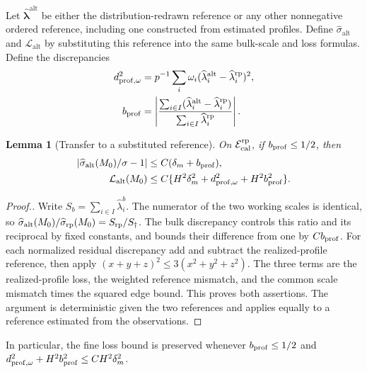 \documentclass[numsec,webpdf,modern,large,namedate]{oup-authoring-template}
\theoremstyle{plain}
\newtheorem{slemma}{Lemma}%
\theoremstyle{remark}
\newif\ifmarkchanges
\newenvironment{revision}{\begingroup\ifmarkchanges\color{red}\fi}{\endgroup}
\begin{document}
\begin{revision}
Let $\widehat{\bm\lambda}^{\mathrm{alt}}$ be either the distribution-redrawn
reference or any other nonnegative ordered reference, including one constructed
from estimated profiles.  Define $\widehat\sigma_{\mathrm{alt}}$ and
$\mathcal L_{\mathrm{alt}}$ by substituting this reference into the same
bulk-scale and loss formulas.  Define the discrepancies
\begin{align}
 d_{\rm prof,\omega}^2
 &=p^{-1}\sum_i\omega_i
       (\widehat\lambda_i^{\mathrm{alt}}-\widehat\lambda_i^{\rm rp})^2,
 \label{eq:vp_profile_weighted_mismatch}\\
 b_{\rm prof}
 &=\left|\frac{\sum_{i\in I}(\widehat\lambda_i^{\mathrm{alt}}
                          -\widehat\lambda_i^{\rm rp})}
                    {\sum_{i\in I}\widehat\lambda_i^{\rm rp}}\right|.
 \label{eq:vp_profile_bulk_mismatch}
\end{align}
\begin{slemma}[Transfer to a substituted reference]
\label{lem:vp_distribution_redraw}
On $\mathcal E_{\rm cal}^{\rm rp}$, if $b_{\rm prof}\le1/2$,
then
\begin{align}
 |\widehat\sigma_{\mathrm{alt}}(M_0)/\sigma-1|
 &\le C(\delta_m+b_{\rm prof}),
 \label{eq:vp_distribution_sigma}\\
 \mathcal L_{\mathrm{alt}}(M_0)
 &\le C\{H^2\delta_m^2+d_{\rm prof,\omega}^2
                           +H^2b_{\rm prof}^2\}.
 \label{eq:vp_distribution_loss}
\end{align}
\end{slemma}
\begin{proof}[Proof.]
Write $S_b=\sum_{i\in I}\widehat\lambda_i^b$.
The numerator of the two working scales is identical, so
$\widehat\sigma_{\mathrm{alt}}(M_0)/\widehat\sigma_{\rm rp}(M_0)
=S_{\rm rp}/S_{\dagger}$.
The bulk discrepancy controls this ratio and its reciprocal by fixed
constants, and bounds their difference from one by $Cb_{\rm prof}$.
For each normalized residual discrepancy add and subtract the realized-profile
reference, then apply $(x+y+z)^2\le3(x^2+y^2+z^2)$.
The three terms are the realized-profile loss, the weighted reference
mismatch, and the common scale mismatch times the squared edge bound.
This proves both assertions.  The argument is deterministic given the two references and applies equally
to a reference estimated from the observations.
\end{proof}

In particular, the fine loss bound is preserved whenever
$b_{\rm prof}\le1/2$ and
$d_{\rm prof,\omega}^2+H^2b_{\rm prof}^2
\le CH^2\delta_m^2$.


\end{revision}
\end{document}
